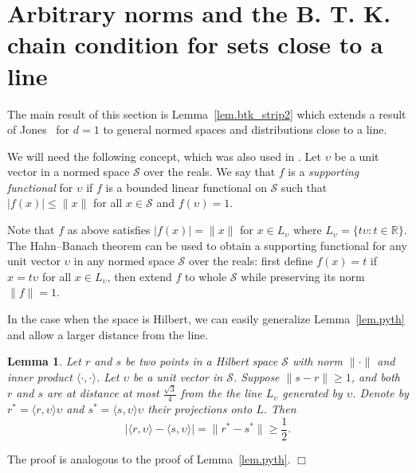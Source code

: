 \documentclass{article}
\newenvironment{proof}{\noindent{\bf Proof}}{\hspace*{\fill}$\Box$}
\newtheorem{lemma} [theorem] {Lemma}\newtheorem{attempt} [theorem] {Attempt}\newtheorem{corollary} [theorem] {Corollary}\newtheorem{prop} [theorem] {Proposition}\newtheorem{definition} [theorem] {Definition}\newtheorem{remark} [theorem] {Remark}\newtheorem{conjecture} [theorem] {Conjecture}\newtheorem{claim} [theorem] {Claim}
\begin{document}
\section {Arbitrary norms and the B. T. K. chain condition for sets close to a line}
\label{sec.btk}

The main result of this section is Lemma~\ref{lem.btk_strip2} which extends a result of Jones~\cite{jones}
for $d=1$ to general normed spaces and distributions close to a line.

We will need the following concept, which was also used in \cite{LR}.
Let $\upsilon$ be a unit vector in a normed space $\mathcal{S}$ over the reals.
    We say that $f$ is a \emph{supporting functional} for $\upsilon$ if
    $f$ is a bounded linear functional on $\mathcal{S}$ such
    that $|f(x)| \le \|x\|$ for all $x \in \mathcal{S}$ and
    $f(\upsilon) = 1$.


Note that $f$ as above satisfies $|f(x)|=\|x\|$ for $x \in L_\upsilon$ where $L_\upsilon = \{t \upsilon: t \in \mathbb{R}\}$.
The Hahn--Banach theorem can be used to obtain a supporting functional for any unit vector $\upsilon$ in any normed space $\mathcal{S}$ over the reals: first define $f(x) = t$ if $x = t \upsilon$ for all $x\in L_\upsilon$, then extend $f$ to whole $\mathcal{S}$ while preserving its norm $\|f\|=1$.


In the case when the space is Hilbert, we
can easily generalize Lemma~\ref{lem.pyth} and allow a larger distance from the line. 

\begin{lemma}\label{lem.pyth_gen}
    Let $r$ and $s$ be
two points in a Hilbert space $\mathcal{S}$ with norm $\|\cdot\|$ and inner product $\langle \cdot, \cdot \rangle$.
    Let $\upsilon$ be a unit vector in $\mathcal{S}$.
    Suppose $\|s-r\| \ge 1$, and both $r$ and $s$ are at distance at most $\frac {\sqrt 3} 4$ from the 
    the line $L_\upsilon$ generated by $\upsilon$. Denote by $r^*=\langle r, \upsilon \rangle \upsilon$ and $s^*=\langle s,\upsilon \rangle \upsilon$ their projections
    onto $L$. Then
    \begin{equation*} |\langle r,\upsilon \rangle - \langle s, \upsilon \rangle| = \|r^*-s^*\| \ge
        \frac 1 2.
    \end{equation*}
\end{lemma}
\begin{proof}
    The proof is analogous to the proof of Lemma~\ref{lem.pyth}.
\end{proof}
\end{document}
